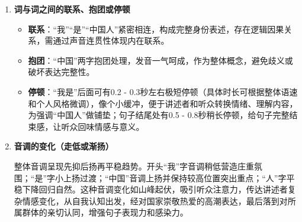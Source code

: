 \begin{gptbox}
{\begin{enumerate}
\begin{enumerate}
                        节奏正常节奏收尾，利落干脆结束句子讲述。
              \end{enumerate}
        \item \textbf{词与词之间的联系、抱团或停顿}
              \begin{itemize}
                  \item \textbf{联系}：“我”“是”“中国人”紧密相连，构成完整身份表述，存在逻辑因果关系，需通过声音连贯性体现内在联系。
                  \item \textbf{抱团}：“中国”两字抱团处理，发音一气呵成，作为整体概念，避免歧义或破坏表达完整性。
                  \item \textbf{停顿}：“我是”后面可有0.2 - 0.3秒左右极短停顿（具体时长可根据整体语速和个人风格微调），像个小缓冲，便于讲述者和听众转换情绪、理解内容，为强调“中国人”做铺垫；句子结尾处有0.5 - 0.8秒稍长停顿，给句子完整结束感，让听众回味情感与意义。
              \end{itemize}
        \item \textbf{音调的变化（走低或渐扬）}

              整体音调呈现先抑后扬再平稳趋势。开头“我”字音调稍低营造庄重氛围；“是”字小上扬过渡；“中国”音调上扬并保持较高位置突出重点；“人”字平稳下降回归自然。这种音调变化如山峰起伏，吸引听众注意力，传达讲述者复杂情感变化，从自我认知出发，经对国家崇敬热爱的高潮表达，最后落到对所属群体的亲切认同，增强句子表现力和感染力。
    \end{enumerate}
}
\end{gptbox}


